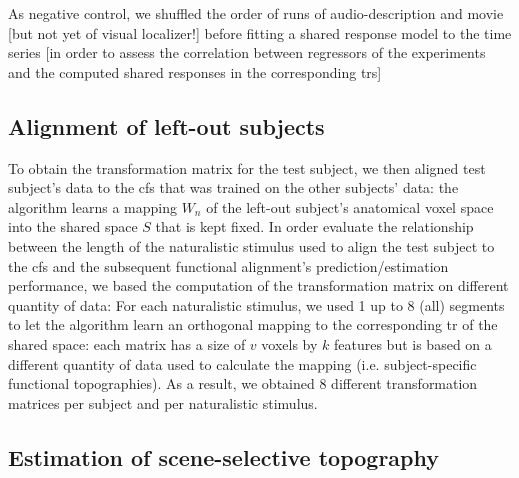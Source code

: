 As negative control, we shuffled the order of runs of audio-description and
movie [but not yet of visual localizer!] before fitting a shared response model
to the time series [in order to assess the correlation between regressors of the
experiments and the computed shared responses in the corresponding \acp{tr}]


\subsection{Alignment of left-out subjects}






%
To obtain the transformation matrix for the test subject, we then aligned
test subject's data to the \ac{cfs} that was trained on the
other subjects' data:
%
the algorithm learns a mapping $W_{n}$ of the left-out subject's anatomical
voxel space into the shared space $S$ that is kept fixed.
%
In order evaluate the relationship between the length of the naturalistic
stimulus used to align the test subject to the \ac{cfs} and the
subsequent functional alignment's prediction/estimation performance, we based
the computation of the transformation matrix on different quantity of data:
%
For each naturalistic stimulus, we used 1 up to 8 (all) segments to let the
algorithm learn an orthogonal mapping to the corresponding \acs{tr} of the
shared space:
%
each matrix has a size of $v$ voxels by $k$ features but is based on a different
quantity of data used to calculate the mapping (i.e. subject-specific functional
topographies).
%
As a result, we obtained 8 different transformation matrices per subject and per
naturalistic stimulus.


\subsection{Estimation of scene-selective topography}



